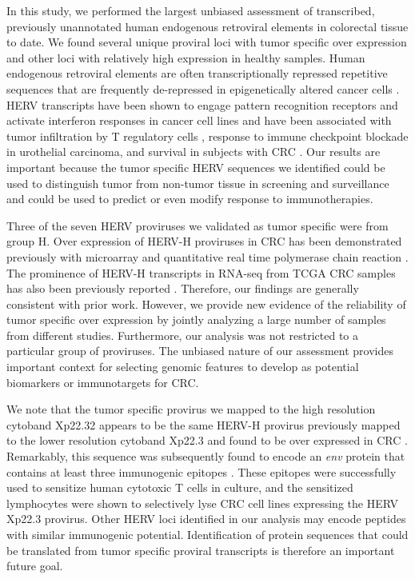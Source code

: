 In this study, we performed the largest unbiased assessment of transcribed, previously unannotated human endogenous retroviral elements in colorectal tissue to date.
We found several unique proviral loci with tumor specific over expression and other loci with relatively high expression in healthy samples.
Human endogenous retroviral elements are often transcriptionally repressed repetitive sequences that are frequently de-repressed in epigenetically altered cancer cells \citep{Babaian2016}.
HERV transcripts have been shown to engage pattern recognition receptors and activate interferon responses in cancer cell lines \citep{Chiappinelli2015, Roulois2015} and have been associated with tumor infiltration by T regulatory cells \citep{Desai2017}, response to immune checkpoint blockade in urothelial carcinoma, and survival in subjects with CRC \citep{Solovyov2018}.
Our results are important because the tumor specific HERV sequences we identified could be used to distinguish tumor from non-tumor tissue in screening and surveillance and could be used to predict or even modify response to immunotherapies.

Three of the seven HERV proviruses we validated as tumor specific were from group H.
Over expression of HERV-H proviruses in CRC has been demonstrated previously with microarray \citep{Perot2012} and quantitative real time polymerase chain reaction \citep{Perot2015}.
The prominence of HERV-H transcripts in RNA-seq from TCGA CRC samples has also been previously reported \citep{Desai2017, Attig2019}.
Therefore, our findings are generally consistent with prior work.
However, we provide new evidence of the reliability of tumor specific over expression by jointly analyzing a large number of samples from different studies.
Furthermore, our analysis was not restricted to a particular group of proviruses.
The unbiased nature of our assessment provides important context for selecting genomic features to develop as potential biomarkers or immunotargets for CRC.

We note that the tumor specific provirus we mapped to the high resolution cytoband Xp22.32 appears to be the same HERV-H provirus previously mapped to the lower resolution cytoband Xp22.3 and found to be over expressed in CRC \citep{Wentzensen2007}.
Remarkably, this sequence was subsequently found to encode an \emph{env} protein that contains at least three immunogenic epitopes \citep{Mullins2012}.
These epitopes were successfully used to sensitize human cytotoxic T cells in culture, and the sensitized lymphocytes were shown to selectively lyse CRC cell lines expressing the HERV Xp22.3 provirus.
Other HERV loci identified in our analysis may encode peptides with similar immunogenic potential.
Identification of protein sequences that could be translated from tumor specific proviral transcripts is therefore an important future goal.

